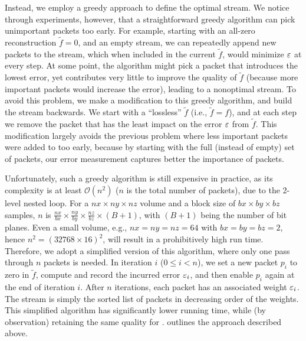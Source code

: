 Instead, we employ a greedy approach to define the optimal stream. We notice through experiments,
however, that a straightforward greedy algorithm can pick unimportant packets too early. For
example, starting with an all-zero reconstruction $\tilde{f}=0$, and an empty stream, we can
repeatedly append new packets to the stream, which when included in the current $\tilde{f}$, would
minimize $\err$ at every step. At some point, the algorithm might pick a packet that introduces the
lowest error, yet contributes very little to improve the quality of $\tilde{f}$ (because more
important packets would increase the error), leading to a nonoptimal stream. To avoid this problem,
we make a modification to this greedy algorithm, and build the stream backwards. We start with a
``lossless'' $\tilde{f}$ (i.e., $\tilde{f}=f$), and at each step we remove the packet that has the
least impact on the error $\err$ from $\tilde{f}$. This modification largely avoids the previous
problem where less important packets were added to \sopt too early, because by starting with the
full (instead of empty) set of packets, our error measurement captures better the importance of
packets.

Unfortunately, such a greedy algorithm is still expensive in practice, as its complexity is at least
$\mathcal{O}(n^2)$ ($n$ is the total number of packets), due to the 2-level nested loop. For a
$nx\times ny \times nz$ volume and a block size of $bx\times by\times bz$ samples, $n$ is
$\frac{nx}{bx}\times \frac{ny}{by}\times \frac{nz}{bz} \times (B+1)$, with $(B+1)$ being the number
of bit planes. Even a small volume, e.g., $nx=ny=nz=64$ with $bx=by=bz=2$, hence $n^2=(32768\times
16)^2$, will result in a prohibitively high run time. Therefore, we adopt a simplified version of
this algorithm, where only one pass through $n$ packets is needed. In iteration $i$ ($0\leq i < n$),
we set a new packet $p_i$ to zero in $\tilde{f}$, compute and record the incurred error $\err_i$,
and then enable $p_i$ again at the end of iteration $i$. After $n$ iterations, each packet has an
associated weight $\err_i$. The stream \sopt is simply the sorted list of packets in decreasing
order of the weights. This simplified algorithm has significantly lower running time, while (by
observation) retaining the same quality for \sopt.  outlines the approach described
above.

